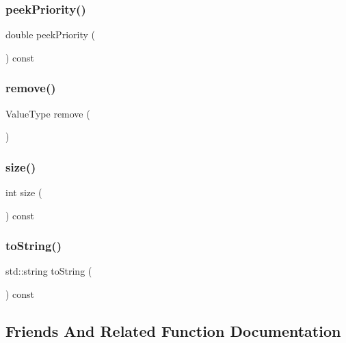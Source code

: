 \subsubsection{\texorpdfstring{peek\+Priority()}{peekPriority()}}
{\footnotesize\ttfamily double peek\+Priority (\begin{DoxyParamCaption}{ }\end{DoxyParamCaption}) const}

\mbox{\label{classPriorityQueue_a025ec97fa5b04552f5ad0902c1f02ac1}} 
\subsubsection{\texorpdfstring{remove()}{remove()}}
{\footnotesize\ttfamily Value\+Type remove (\begin{DoxyParamCaption}{ }\end{DoxyParamCaption})}

\mbox{\label{classPriorityQueue_af9593d4a5ff4274efaf429cb4f9e57cc}} 
\subsubsection{\texorpdfstring{size()}{size()}}
{\footnotesize\ttfamily int size (\begin{DoxyParamCaption}{ }\end{DoxyParamCaption}) const}

\mbox{\label{classPriorityQueue_a1fe5121d6528fdea3f243321b3fa3a49}} 
\subsubsection{\texorpdfstring{to\+String()}{toString()}}
{\footnotesize\ttfamily std\+::string to\+String (\begin{DoxyParamCaption}{ }\end{DoxyParamCaption}) const}



\subsection{Friends And Related Function Documentation}
\mbox{\label{classPriorityQueue_a533f07b48057f32ab7e31e23fdd21675}} 
